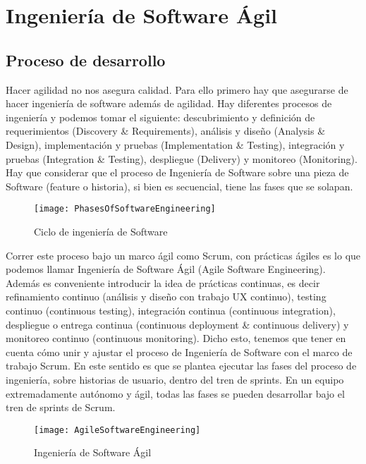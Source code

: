 \chapter{Ingeniería de Software Ágil}

\section{Proceso de desarrollo}

Hacer agilidad no nos asegura calidad. Para ello primero hay que asegurarse de hacer ingeniería de software además de agilidad. Hay diferentes procesos de ingeniería y podemos tomar el siguiente: descubrimiento y definición de requerimientos (Discovery \& Requirements), análisis y diseño (Analysis \& Design), implementación y pruebas (Implementation \& Testing), integración y pruebas (Integration \& Testing), despliegue (Delivery) y monitoreo (Monitoring). Hay que considerar que el proceso de Ingeniería de Software sobre una pieza de Software (feature o historia), si bien es secuencial, tiene las fases que se solapan. 

\begin{figure}[h]
  \centering
  \texttt{[image: PhasesOfSoftwareEngineering]}
  \caption{Ciclo de ingeniería de Software}
  \centering
  \label{fig:PhasesOfSoftwareEngineering} %
\end{figure}

Correr este proceso bajo un marco ágil como Scrum, con prácticas ágiles es lo que podemos llamar Ingeniería de Software Ágil (Agile Software Engineering). Además es conveniente introducir la idea de prácticas continuas, es decir refinamiento continuo (análisis y diseño con trabajo UX continuo), testing continuo (continuous testing), integración continua (continuous integration), despliegue o entrega continua (continuous deployment \& continuous delivery) y monitoreo continuo (continuous monitoring). 
Dicho esto, tenemos que tener en cuenta cómo unir y ajustar el proceso de Ingeniería de Software con el marco de trabajo Scrum. En este sentido es que se plantea ejecutar las fases del proceso de ingeniería, sobre historias de usuario, dentro del tren de sprints. En un equipo extremadamente autónomo y ágil, todas las fases se pueden desarrollar bajo el tren de sprints de Scrum.

\begin{figure}[h]
  \centering
  \texttt{[image: AgileSoftwareEngineering]}
  \caption{Ingeniería de Software Ágil}
  \centering
  \label{fig:AgileSoftwareEngineering} %
\end{figure}

